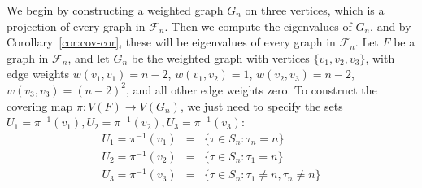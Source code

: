 We begin by constructing a weighted graph $G_n$ on three vertices, which is
a projection of every graph in $\mathcal{F}_n$.  Then we compute the 
eigenvalues of $G_n$, and by Corollary~\ref{cor:cov-cor}, these will be 
eigenvalues of every graph in $\mathcal{F}_n$.  
Let $F$ be a graph in $\mathcal{F}_n$, and 
let $G_n$ be the weighted graph with vertices $\{v_1, v_2, v_3\}$,
with edge weights $w(v_1,v_1) = n-2$, $w(v_1,v_2) = 1$, $w(v_2, v_3) = n-2$,
$w(v_3,v_3) = (n-2)^2$, and all other edge weights zero.
To construct the covering map $\pi : V(F) \to V(G_n)$, we just need to 
specify the sets $U_1 = \pi^{-1}(v_1), U_2 = \pi^{-1}(v_2), U_3 = \pi^{-1}(v_3)$: 
\begin{eqnarray*}
 U_1 = \pi^{-1}(v_1) & = & \{\tau \in S_n : \tau_n = n \} \\
 U_2 = \pi^{-1}(v_2) & = & \{\tau \in S_n : \tau_1 = n \} \\
 U_3 = \pi^{-1}(v_3) & = & \{\tau \in S_n : \tau_1 \neq n, \tau_n \neq n \}  
\end{eqnarray*}


